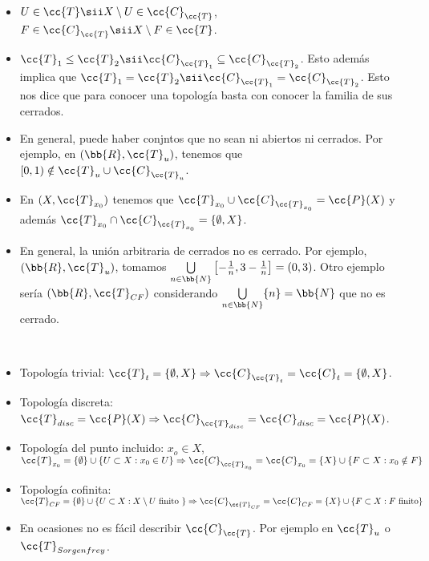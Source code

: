 \begin{observacion}\
    \begin{itemize}
        \item $U\in \cc{T}\sii X \setminus U \in \cc{C}_{\cc{T}}$, $F\in \cc{C}_{\cc{T}} \sii X\setminus F \in \cc{T}$.
        \item $\cc{T}_1 \leq \cc{T}_2\sii \cc{C}_{\cc{T}_1}\subseteq \cc{C}_{\cc{T}_2}$. Esto además implica que $\cc{T}_1=\cc{T}_2 \sii \cc{C}_{\cc{T}_1} = \cc{C}_{\cc{T}_2}$. Esto nos dice que para conocer una topología basta con conocer la familia de sus cerrados.
        \item En general, puede haber conjntos que no sean ni abiertos ni cerrados. Por ejemplo, en $(\bb{R}, \cc{T}_u)$, tenemos que $[0,1)\notin \cc{T}_u\cup \cc{C}_{\cc{T}_u}$.
        \item En $(X, \cc{T}_{x_0})$ tenemos que $\cc{T}_{x_0}\cup \cc{C}_{\cc{T}_{x_0}} = \cc{P}(X)$ y además $\cc{T}_{x_0}\cap \cc{C}_{\cc{T}_{x_0}}=\{\emptyset, X\}$.
        \item En general, la unión arbitraria de cerrados no es cerrado. Por ejemplo, $(\bb{R}, \cc{T}_u)$, tomamos $\bigcup\limits_{n\in \bb{N}}\left[-\frac{1}{n}, 3-\frac{1}{n}\right] = (0,3)$. Otro ejemplo sería $(\bb{R}, \cc{T}_{CF})$ considerando $\bigcup\limits_{n\in \bb{N}}\{n\}=\bb{N}$ que no es cerrado.
    \end{itemize}
    \endsquare
\end{observacion}
\begin{ejemplo}\
    \begin{itemize}
        \item Topología trivial: $\cc{T}_t=\{\emptyset, X\} \Rightarrow \cc{C}_{\cc{T}_t} = \cc{C}_t = \{\emptyset, X\}$.
        \item Topología discreta: $\cc{T}_{disc} = \cc{P}(X) \Rightarrow \cc{C}_{\cc{T}_{disc}} = \cc{C}_{disc} = \cc{P}(X)$.
        \item Topología del punto incluido: $x_o \in X$, $\cc{T}_{x_0}=\{\emptyset\} \cup \{U\subset X : x_0 \in U\} \Rightarrow \cc{C}_{\cc{T}_{x_0}} = \cc{C}_{x_0} = \{X\}\cup \{F \subset X : x_0 \notin F\}$
        \item Topología cofinita: $\cc{T}_{CF} = \{\emptyset\}\cup \{U\subset X : X \setminus U \text{ finito }\} \Rightarrow \cc{C}_{\cc{T}_{CF}}=\cc{C}_{CF}=\{X\}\cup \{F\subset X : F \text{ finito}\}$
        \item En ocasiones no es fácil describir $\cc{C}_{\cc{T}}$. Por ejemplo en $\cc{T}_u$ o $\cc{T}_{Sorgenfrey}$.
    \end{itemize}
    \endsquare
\end{ejemplo}

